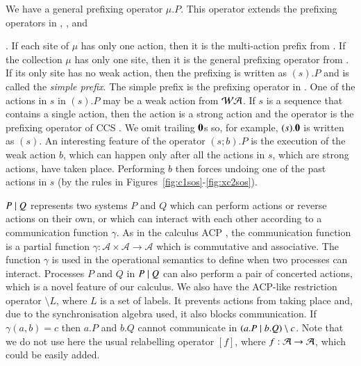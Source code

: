 We have a general prefixing operator $\mu.P$. This operator
extends the prefixing operators in \cite{DK2007}, \cite{Irek2012}, and {\cite{KU16,KU2017}. 
If each site of $\mu$ has only one action, then it is the multi-action prefix from \cite{DK2007}.
If the collection $\mu$ has only one site, then it is the general prefixing operator from \cite{KU16,KU2017}. 
If its only site has no weak action, then the prefixing is written as $(s).P$ and is called the
\emph{simple prefix}. 
The simple prefix is the prefixing operator in \cite{Irek2012}. 
One of the actions in $s$ in $(s).P$ may be a weak action from $\mathcal{WA}$. If $s$ is a sequence that contains   
a single action, then the action is a strong action and the operator 
is the prefixing operator of CCS \cite{Milner1980}.
We omit trailing $\mathbf{0}$s so, for example, $(s).\mathbf{0}$ is written as $(s)$.
%
%
%
%
An interesting feature of the operator $(s;b).P$ is the execution of the weak action $b$, which
can happen only after all the actions in $s$, which are strong actions, have taken place. Performing $b$ then forces
undoing one of the past actions in $s$ (by the  rules in Figures~\ref{fig:c1sos}-\ref{fig:xc2sos}).

$P\; \vert \; Q$ represents two systems $P$ and $Q$ which can perform actions or reverse actions on
their own, or which can interact with each other according to a communication function
$\gamma$. As in the calculus ACP \cite{ACPBook}, the communication function is a partial function 
$\gamma: \mathcal A \times \mathcal A \rightarrow \mathcal A$ which is commutative and associative. The function
$\gamma$ is used in the operational semantics to define when two processes can interact.  Processes 
$P$ and $Q$ in $P\; \vert \; Q$ can also perform a pair of concerted actions,
which is a novel feature of our calculus.  We also have the ACP-like restriction operator 
$\setminus L$, where $L$ is a set of labels. It prevents actions from taking place and, due to 
the synchronisation algebra used, it also blocks communication. If $\gamma(a,b)=c$ then $a.P$ and $b.Q$
cannot communicate in $(a.P\; \vert \; b.Q)\setminus c$.
Note that we do not use here the usual relabelling 
operator $[f]$, where $f: \mathcal{A} \rightarrow \mathcal{A}$, which could be easily added.

}
